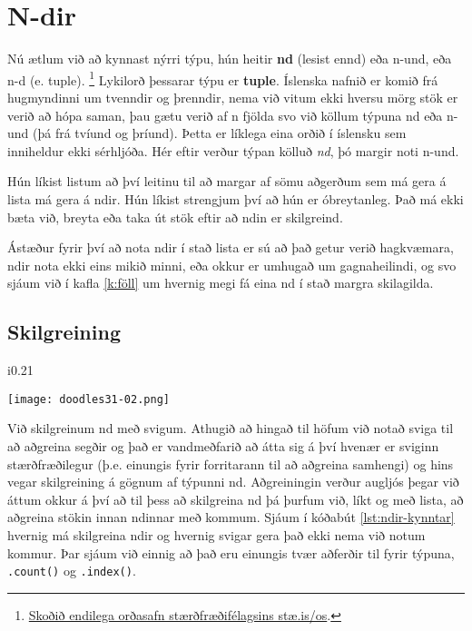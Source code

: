 
\chapter{N-dir}\label{k:ndir}
Nú ætlum við að kynnast nýrri týpu, hún heitir \textbf{nd} (lesist ennd) eða n-und, eða n-d (e. tuple).
\footnote{\href{http://stae.is/os}{Skoðið endilega orðasafn stærðfræðifélagsins stæ.is/os}.}
Lykilorð þessarar týpu er \textbf{tuple}.
Íslenska nafnið er komið frá hugmyndinni um tvenndir og þrenndir, nema við vitum ekki hversu mörg stök er verið að hópa saman, þau gætu verið af n fjölda svo við köllum týpuna nd eða n-und (þá frá tvíund og þríund).
Þetta er líklega eina orðið í íslensku sem inniheldur ekki sérhljóða.
Hér eftir verður týpan kölluð \emph{nd}, þó margir noti n-und.

Hún líkist listum að því leitinu til að margar af sömu aðgerðum sem má gera á lista má gera á ndir.
Hún líkist strengjum því að hún er óbreytanleg.
Það má ekki bæta við, breyta eða taka út stök eftir að ndin er skilgreind.

Ástæður fyrir því að nota ndir í stað lista er sú að það getur verið hagkvæmara, ndir nota ekki eins mikið minni, eða okkur er umhugað um gagnaheilindi, og svo sjáum við í kafla \ref{k:föll} um hvernig megi fá eina nd í stað margra skilagilda.

\section{Skilgreining}
 \begin{wrapfigure}{i}{0.21\textwidth} %
	\begin{center}
		\texttt{[image: doodles31-02.png]}
	\end{center}
\end{wrapfigure}
Við skilgreinum nd með svigum.
Athugið að hingað til höfum við notað sviga til að aðgreina segðir og það er vandmeðfarið að átta sig á því hvenær er sviginn stærðfræðilegur (þ.e. einungis fyrir forritarann til að aðgreina samhengi) og hins vegar skilgreining á gögnum af týpunni nd.
Aðgreiningin verður augljós þegar við áttum okkur á því að til þess að skilgreina nd þá þurfum við, líkt og með lista, að aðgreina stökin innan ndinnar með kommum.
Sjáum í kóðabút \ref{lst:ndir-kynntar} hvernig má skilgreina ndir og hvernig svigar gera það ekki nema við notum kommur.
Þar sjáum við einnig að það eru einungis tvær aðferðir til fyrir týpuna, \texttt{.count()} og \texttt{.index()}.

